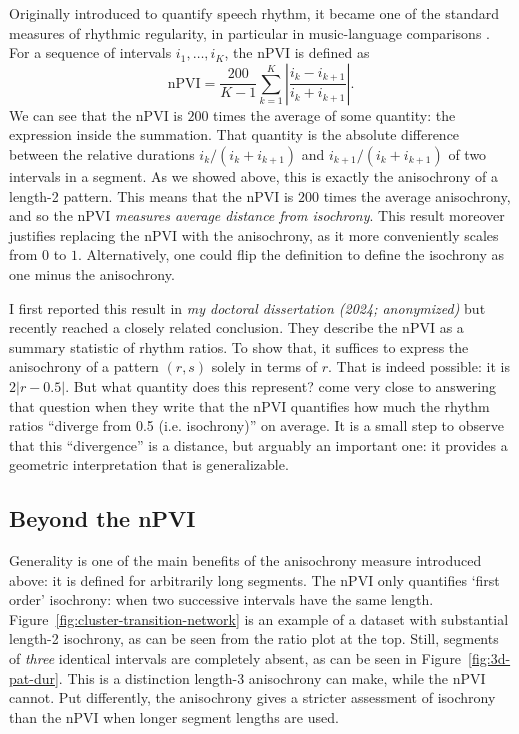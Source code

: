 \documentclass{tMAM2e}%
\theoremstyle{plain}
\theoremstyle{definition}
\theoremstyle{remark}
\begin{document}
Originally introduced to quantify speech rhythm, it became one of the standard measures of rhythmic regularity, in particular in music-language comparisons \citep[see e.g.][]{Condit-Schultz2019MusicPercept,VanHandel2022}.
For a sequence of intervals $i_1, \dots, i_K$, the nPVI is defined as 
\[
\text{nPVI} 
  = \frac{200}{K-1}  
    \sum_{k=1}^K \left| \frac{i_k - i_{k+1}}{i_k + i_{k+1}} \right|.
\]
We can see that the nPVI is $200$ times the average of some quantity: the expression inside the summation. 
That quantity is the absolute difference between the relative durations $i_k / (i_k + i_{k+1})$ and $i_{k+1} / (i_k + i_{k+1})$ of two intervals in a segment. 
As we showed above, this is exactly the anisochrony of a length-2 pattern. 
This means that the nPVI is $200$ times the average anisochrony, and so the nPVI \emph{measures average distance from isochrony}. 
This result moreover justifies replacing the nPVI with the anisochrony, as it more conveniently scales from $0$ to $1$. 
Alternatively, one could flip the definition to define the isochrony as one minus the anisochrony.

I first reported this result in \emph{{\color{red} my doctoral dissertation (2024; anonymized)}}
but \citet{Jadoul2025Vibration} recently reached a closely related conclusion. 
They describe the nPVI as a summary statistic of rhythm ratios. 
To show that, it suffices to express the anisochrony of a pattern $(r, s)$ solely in terms of $r$. 
That is indeed possible: it is $2|r - 0.5|$. 
But what quantity does this represent? 
\citet{Jadoul2025Vibration} come very close to answering that question when they write that the nPVI quantifies how much the rhythm ratios “diverge from 0.5 (i.e. isochrony)” on average. 
It is a small step to observe that this “divergence” is a distance, but arguably an important one: it provides a geometric interpretation that is generalizable.


\subsection{Beyond the nPVI}
Generality is one of the main benefits of the anisochrony measure introduced above: it is defined for arbitrarily long segments. 
The nPVI only quantifies ‘first order’ isochrony: when two successive intervals have the same length. 
Figure~\ref{fig:cluster-transition-network}
is an example of a dataset with substantial length-2 isochrony, as can be seen from the ratio plot at the top. 
Still, segments of \emph{three} identical intervals are completely absent, as can be seen in Figure~\ref{fig:3d-pat-dur}.
This is a distinction length-3 anisochrony can make, while the nPVI cannot. 
Put differently, the anisochrony gives a stricter assessment of isochrony than the nPVI when longer segment lengths are used.
\end{document}
